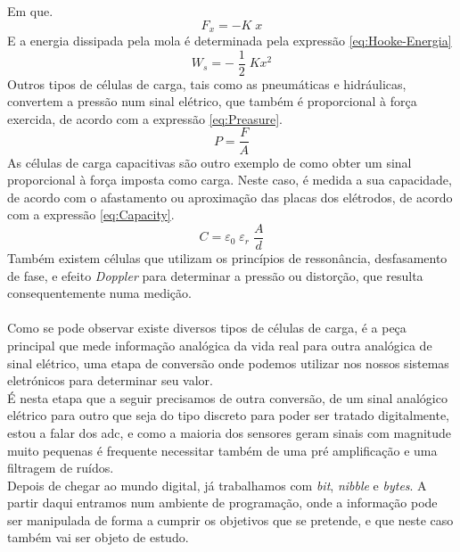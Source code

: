 Em que.
\begin{equation}
	\label{eq:Lei-de-Hooke}
	F_x = -K \; x
\end{equation}
E a energia dissipada pela mola é determinada pela expressão \eqref{eq:Hooke-Energia}
\begin{equation}
	\label{eq:Hooke-Energia}
	W_s = - \; \frac{1}{2} \; K x^2
\end{equation}
Outros tipos de células de carga, tais como as pneumáticas e hidráulicas, convertem a pressão num sinal elétrico, que também é proporcional à força exercida, de acordo com a expressão \ref{eq:Preasure}.
\begin{equation}
	\label{eq:Preasure}
	P = \frac{F}{A}
\end{equation}
As células de carga capacitivas são outro exemplo de como obter um sinal proporcional à força imposta como carga. Neste caso, é medida a sua capacidade, de acordo com o afastamento ou aproximação das placas dos elétrodos, de acordo com a expressão \eqref{eq:Capacity}.
\begin{equation}
	\label{eq:Capacity}
	C = \varepsilon_{0} \; \varepsilon_{r} \; \frac{A}{d}
\end{equation}
Também existem células que utilizam os princípios de ressonância, desfasamento de fase, e efeito \textit{Doppler} para determinar a pressão ou distorção, que resulta consequentemente numa medição.
\\
\\
Como se pode observar existe diversos tipos de células de carga, é a peça principal que mede informação analógica da vida real para outra analógica de sinal elétrico, uma etapa de conversão onde podemos utilizar nos nossos sistemas eletrónicos para determinar seu valor.
\\
É nesta etapa que a seguir precisamos de outra conversão, de um sinal analógico elétrico para outro que seja do tipo discreto para poder ser tratado digitalmente, estou a falar dos \ac{adc}, e como a maioria dos sensores geram sinais com magnitude muito pequenas é frequente necessitar também de uma pré amplificação e uma filtragem de ruídos.
\\
Depois de chegar ao mundo digital, já trabalhamos com \textit{bit}, \textit{nibble} e \textit{bytes}. A partir daqui entramos num ambiente de programação, onde a informação pode ser manipulada de forma a cumprir os objetivos que se pretende, e que neste caso também vai ser objeto de estudo.
